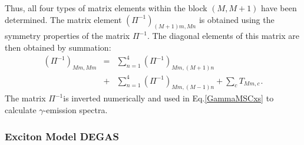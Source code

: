 \documentclass[twocolumn,amsmath,amssymb,10pt,groupedaddress,letter]{revtex4}
\begin{document}
Thus, all four types of matrix elements within the block $(M,M+1)$
have been determined. The matrix element $(\Pi^{-1})_{(M+1)m,Mn}$
is obtained using the symmetry properties of the matrix $\Pi^{-1}$.
The diagonal elements of this matrix are then obtained by summation:
\begin{eqnarray}
(\Pi^{-1})_{Mm,Mm} &=& \sum_{n=1}^{4}(\Pi^{-1})_{Mm,(M+1)n}  \\
&+& \sum_{n=1}^{4}(\Pi^{-1})_{Mm,(M-1)n} + \sum_{c}T_{Mm,c} \hspace{1pt}.\nonumber
\end{eqnarray}
The matrix $\Pi^{-1}$is inverted numerically and used in Eq.\ref{GammaMSCxs}
to calculate $\gamma$-emission spectra.



\subsubsection{Exciton Model DEGAS\label{DEGAS}}
\end{document}
